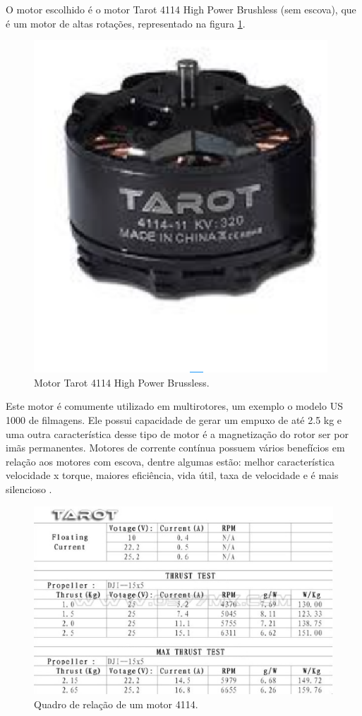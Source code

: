 O motor escolhido é o motor Tarot 4114 High Power Brushless (sem escova), que é um motor de altas rotações, representado na figura \ref{fig:tarot2}.

\begin{figure}[H]
    \centering
      \includegraphics[keepaspectratio=true,scale=0.5]{figuras/tarot2.eps}
    \caption{Motor Tarot 4114 High Power Brussless. \cite{tarot}}
    \label{fig:tarot2}
\end{figure}

Este motor é comumente utilizado em  multirotores, um exemplo o modelo US 1000 de filmagens. Ele possui capacidade de gerar um empuxo de até 2.5 kg e uma outra característica desse tipo de motor é a magnetização do rotor ser por imãs permanentes. Motores de corrente contínua possuem vários benefícios em relação aos motores com escova, dentre algumas estão: melhor característica velocidade x torque, maiores eficiência, vida útil, taxa de velocidade e é mais silencioso \cite{nascimento}.

\begin{figure}[H]
    \centering
      \includegraphics[keepaspectratio=true,scale=0.5]{figuras/tarot.eps}
    \caption{Quadro de relação de um motor 4114.\cite{tarot}}
    \label{fig:tarot}
\end{figure}


